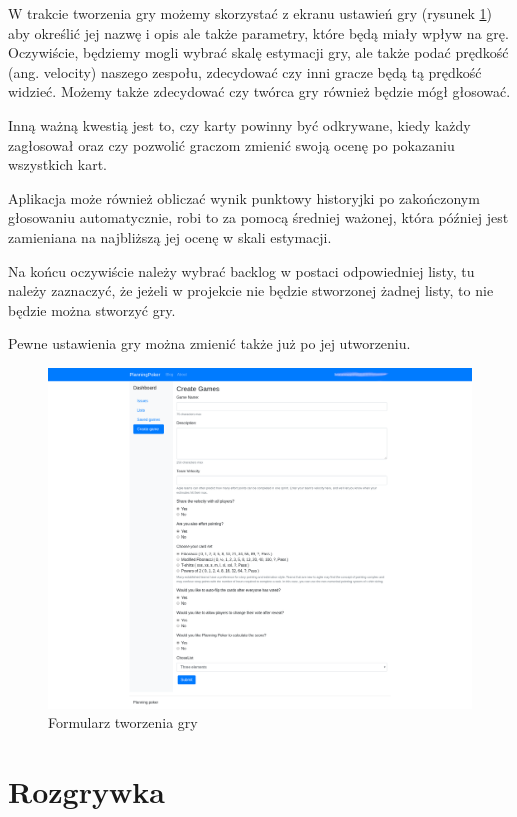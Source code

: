 W trakcie tworzenia gry możemy skorzystać z ekranu ustawień gry (rysunek \ref{rys:form})
aby określić jej nazwę i opis ale także parametry, które będą miały wpływ na grę.
Oczywiście, będziemy mogli wybrać skalę estymacji gry, ale także podać prędkość (ang. velocity)
naszego zespołu, zdecydować czy inni gracze będą tą prędkość widzieć.
Możemy także zdecydować czy twórca gry również będzie mógł głosować.

Inną ważną kwestią jest to, czy karty powinny być odkrywane, kiedy każdy zagłosował
oraz czy pozwolić graczom zmienić swoją ocenę po pokazaniu wszystkich kart.

Aplikacja może również obliczać wynik punktowy historyjki po zakończonym głosowaniu automatycznie,
robi to za pomocą średniej ważonej, która później jest zamieniana na najbliższą jej ocenę w skali estymacji.

Na końcu oczywiście należy wybrać backlog w postaci odpowiedniej listy, tu należy zaznaczyć,
że jeżeli w projekcie nie będzie stworzonej żadnej listy, to nie będzie można stworzyć gry.

Pewne ustawienia gry można zmienić także już po jej utworzeniu.

\begin{figure}[H]
	\centering\includegraphics[width=\textwidth]{img/Formularz}
	\caption{Formularz tworzenia gry}\label{rys:form}%
\end{figure}

\section{Rozgrywka}

